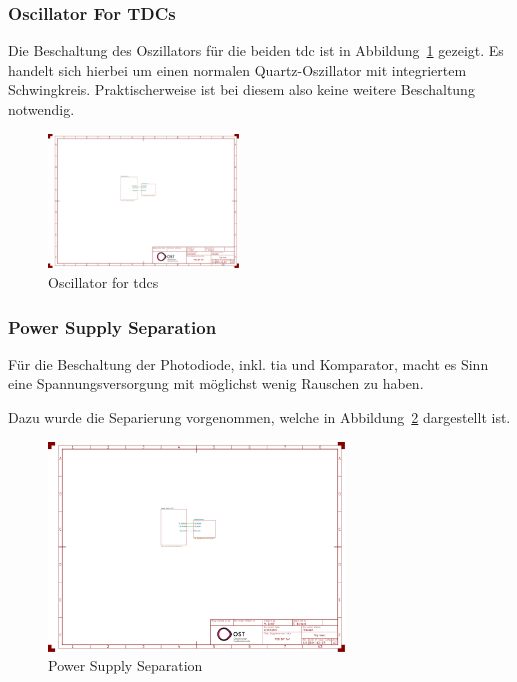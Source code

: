 \documentclass[11pt,a4paper,hidelinks]{article}
\begin{document}
\subsubsection{Oscillator For TDCs}

Die Beschaltung des Oszillators für die beiden \acrshort{tdc} ist in Abbildung~\ref{fig:oscillator_tdc} gezeigt. Es
handelt sich hierbei um einen normalen Quartz-Oszillator mit integriertem Schwingkreis. Praktischerweise ist bei diesem
also keine weitere Beschaltung notwendig.

\begin{figure}[H]
    \centering
    \includegraphics[page=2, trim=80 90 930 550, clip, width=0.45\textwidth]{attachments/schematic.pdf}
    \caption{Oscillator for \acrshort{tdc}s}\label{fig:oscillator_tdc}
\end{figure}

\subsubsection{Power Supply Separation}

Für die Beschaltung der Photodiode, inkl. \acrshort{tia} und Komparator, macht es Sinn eine Spannungsversorgung mit
möglichst wenig Rauschen zu haben.

Dazu wurde die Separierung vorgenommen, welche in Abbildung~\ref{fig:power_supply_separation} dargestellt ist.

\begin{figure}[H]
    \centering
    \includegraphics[page=2, trim=260 90 640 550, clip, width=0.7\textwidth]{attachments/schematic.pdf}
    \caption{Power Supply Separation}\label{fig:power_supply_separation}
\end{figure}
\end{document}
